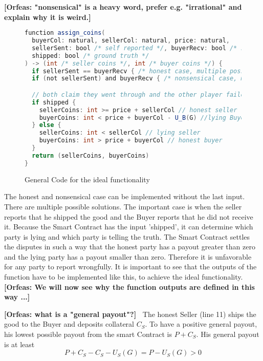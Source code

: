 \documentclass{cacthesis}
\newcommand{\authnote}[3]{{ \footnotesize \textbf{#1[#2: #3]~}}}
\newcommand{\orfnote}[1]{\authnote{\color{blue}}{Orfeas}{#1}}
\begin{document}
\orfnote{"nonsensical" is a heavy word,
prefer e.g. "irrational" and explain why it is weird.}
\begin{figure}[htb!]
    \centering
\begin{lstlisting}[language=java]
function assign_coins(
  buyerCol: natural, sellerCol: natural, price: natural,
  sellerSent: bool /* self reported */, buyerRecv: bool /* self reported */, 
  shipped: bool /* ground truth */
) -> (int /* seller coins */, int /* buyer coins */) {
  if sellerSent == buyerRecv { /* honest case, multiple possible solutions  */ }
  if (not sellerSent) and buyerRecv { /* nonsensical case, multiple possible solutions */ }

  // both claim they went through and the other player failed
  if shipped {
    sellerCoins: int >= price + sellerCol // honest seller
    buyerCoins: int < price + buyerCol - U_B(G) //lying Buyer
  } else {
    sellerCoins: int < sellerCol // lying seller
    buyerCoins: int > price + buyerCol // honest buyer
  }
  return (sellerCoins, buyerCoins)
}
\end{lstlisting}
    \caption{General Code for the ideal functionality}
\end{figure}
The honest and nonsensical case can be implemented without the last input. There are multiple possible solutions.\newline
The important case is when the seller reports that he shipped the good and the Buyer reports that he did not receive it. Because the Smart Contract has the input 'shipped', it can determine which party is lying and which party is telling the truth.\newline
The Smart Contract settles the disputes in such a way that the honest party has a payout greater than zero and the lying party has a payout smaller than zero. Therefore it is unfavorable for any party to report wrongfully.\newline
It is important to see that the outputs of the function have to be implemented
like this, to achieve the ideal functionality. \orfnote{We will now see why the
function outputs are defined in this way ...}\newline

\orfnote{what is a "general payout"?}
The honest Seller (line 11) ships the good to the Buyer and deposits collateral $C_S$. To have a positive general payout, his lowest possible payout from the smart Contract is $P + C_S$. His general payout is at least
\[P + C_S - C_S - U_S(G) = P - U_S(G) > 0\]
\end{document}

